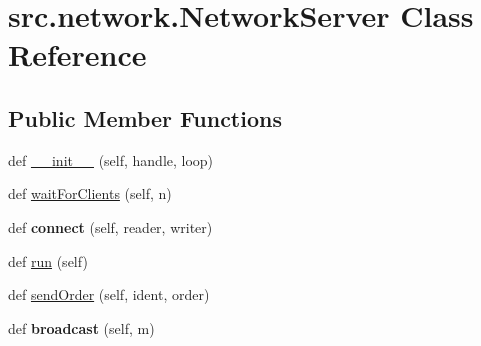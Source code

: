 \hypertarget{classsrc_1_1network_1_1_network_server}{}\section{src.\+network.\+Network\+Server Class Reference}
\label{classsrc_1_1network_1_1_network_server}
\subsection*{Public Member Functions}
\begin{DoxyCompactItemize}
\item 
def \hyperlink{classsrc_1_1network_1_1_network_server_a9448f34dc6fd380090e9ef394d79b548}{\+\_\+\+\_\+init\+\_\+\+\_\+} (self, handle, loop)
\item 
def \hyperlink{classsrc_1_1network_1_1_network_server_abaf17f7c7779a3ee271650d17d533743}{wait\+For\+Clients} (self, n)
\item 
\hypertarget{classsrc_1_1network_1_1_network_server_a618abf006a5224b3366a9a1030259493}{}\label{classsrc_1_1network_1_1_network_server_a618abf006a5224b3366a9a1030259493} 
def {\bfseries connect} (self, reader, writer)
\item 
def \hyperlink{classsrc_1_1network_1_1_network_server_af8c0e34bf4a8b77b6955ca02088686cb}{run} (self)
\item 
def \hyperlink{classsrc_1_1network_1_1_network_server_a3aad105410950059cea094586b40767a}{send\+Order} (self, ident, order)
\item 
\hypertarget{classsrc_1_1network_1_1_network_server_a34b2cf2790354ffa37e80ae8326e25ac}{}\label{classsrc_1_1network_1_1_network_server_a34b2cf2790354ffa37e80ae8326e25ac} 
def {\bfseries broadcast} (self, m)
\end{DoxyCompactItemize}
